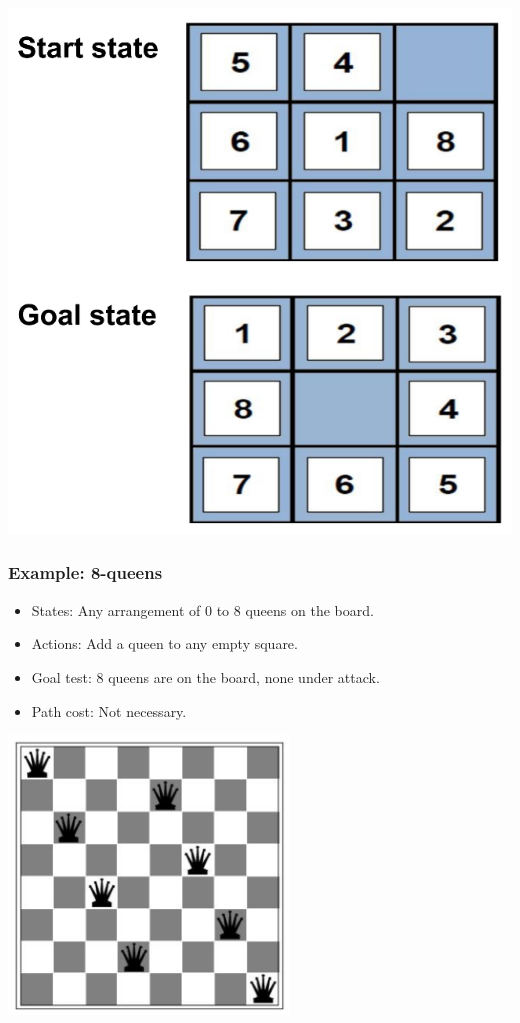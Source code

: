 \documentclass[11pt]{article}
\begin{document}
\begin{center}
\includegraphics[width=.9\linewidth]{./images/8-puzzle-start-and-goal-states.png}
\end{center}

 \newpage
\subsubsection{Example: 8-queens}
\label{sec:org7d393f5}
\begin{itemize}
\item States: Any arrangement of 0 to 8 queens on the board.
\item Actions: Add a queen to any empty square.
\item Goal test: 8 queens are on the board, none under attack.
\item Path cost: Not necessary.
\end{itemize}

\begin{center}
\includegraphics[height=20em]{./images/8-queens-puzzle.png}
\end{center}
\end{document}
